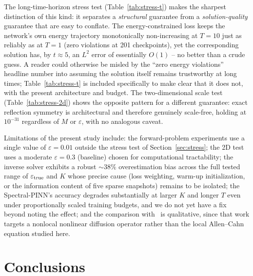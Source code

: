 \documentclass[symmetry,article,submit,moreauthors]{Definitions/mdpi}
\begin{document}
The long-time-horizon stress test (Table~\ref{tab:stress-t}) makes the sharpest distinction of this kind: it separates a \emph{structural} guarantee from a \emph{solution-quality} guarantee that are easy to conflate. The energy-constrained loss keeps the network's own energy trajectory monotonically non-increasing at $T=10$ just as reliably as at $T=1$ (zero violations at 201 checkpoints), yet the corresponding solution has, by $t\approx5$, an $L^2$ error of essentially $O(1)$ -- no better than a crude guess. A reader could otherwise be misled by the ``zero energy violations'' headline number into assuming the solution itself remains trustworthy at long times; Table~\ref{tab:stress-t} is included specifically to make clear that it does not, with the present architecture and budget. The two-dimensional scale test (Table~\ref{tab:stress-2d}) shows the opposite pattern for a different guarantee: exact reflection symmetry is architectural and therefore genuinely scale-free, holding at $10^{-31}$ regardless of $M$ or $\varepsilon$, with no analogous caveat.

Limitations of the present study include: the forward-problem experiments use a single value of $\varepsilon=0.01$ outside the stress test of Section~\ref{sec:stress}; the 2D test uses a moderate $\varepsilon=0.3$ (baseline) chosen for computational tractability; the inverse solver exhibits a robust $\sim38\%$ overestimation bias across the full tested range of $\varepsilon_{\rm true}$ and $K$ whose precise cause (loss weighting, warm-up initialization, or the information content of five sparse snapshots) remains to be isolated; the Spectral-PINN's accuracy degrades substantially at larger $K$ and longer $T$ even under proportionally scaled training budgets, and we do not yet have a fix beyond noting the effect; and the comparison with~\cite{Shiyapov2026} is qualitative, since that work targets a nonlocal nonlinear diffusion operator rather than the local Allen--Cahn equation studied here.

\section{Conclusions}\label{sec:conclusions}
\end{document}
